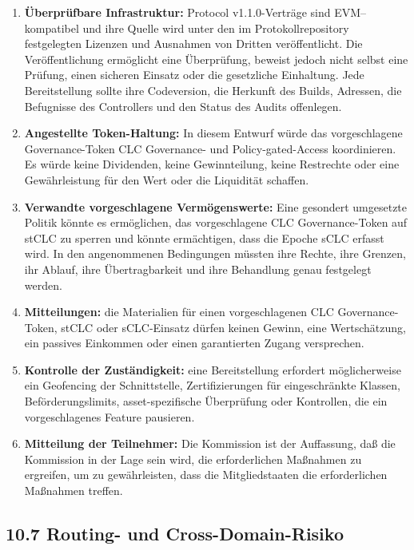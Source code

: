 \documentclass[11pt]{article}
\begin{document}
\begin{enumerate}[leftmargin=*]
\item \textbf{Überprüfbare Infrastruktur:} Protocol v1.1.0-Verträge sind EVM--kompatibel und ihre Quelle wird unter den im Protokollrepository festgelegten Lizenzen und Ausnahmen von Dritten veröffentlicht. Die Veröffentlichung ermöglicht eine Überprüfung, beweist jedoch nicht selbst eine Prüfung, einen sicheren Einsatz oder die gesetzliche Einhaltung. Jede Bereitstellung sollte ihre Codeversion, die Herkunft des Builds, Adressen, die Befugnisse des Controllers und den Status des Audits offenlegen.
\item \textbf{Angestellte Token-Haltung:} In diesem Entwurf würde das vorgeschlagene Governance-Token CLC Governance- und Policy-gated-Access koordinieren. Es würde keine Dividenden, keine Gewinnteilung, keine Restrechte oder eine Gewährleistung für den Wert oder die Liquidität schaffen.
\item \textbf{Verwandte vorgeschlagene Vermögenswerte:} Eine gesondert umgesetzte Politik könnte es ermöglichen, das vorgeschlagene CLC Governance-Token auf stCLC zu sperren und könnte ermächtigen, dass die Epoche sCLC erfasst wird. In den angenommenen Bedingungen müssten ihre Rechte, ihre Grenzen, ihr Ablauf, ihre Übertragbarkeit und ihre Behandlung genau festgelegt werden.
\item \textbf{Mitteilungen:} die Materialien für einen vorgeschlagenen CLC Governance-Token, stCLC oder sCLC-Einsatz dürfen keinen Gewinn, eine Wertschätzung, ein passives Einkommen oder einen garantierten Zugang versprechen.
\item \textbf{Kontrolle der Zuständigkeit:} eine Bereitstellung erfordert möglicherweise ein Geofencing der Schnittstelle, Zertifizierungen für eingeschränkte Klassen, Beförderungslimits, asset-spezifische Überprüfung oder Kontrollen, die ein vorgeschlagenes Feature pausieren.
\item \textbf{Mitteilung der Teilnehmer:} Die Kommission ist der Auffassung, daß die Kommission in der Lage sein wird, die erforderlichen Maßnahmen zu ergreifen, um zu gewährleisten, dass die Mitgliedstaaten die erforderlichen Maßnahmen treffen.
\end{enumerate}
\subsection*{10.7 Routing- und Cross-Domain-Risiko}
\end{document}
